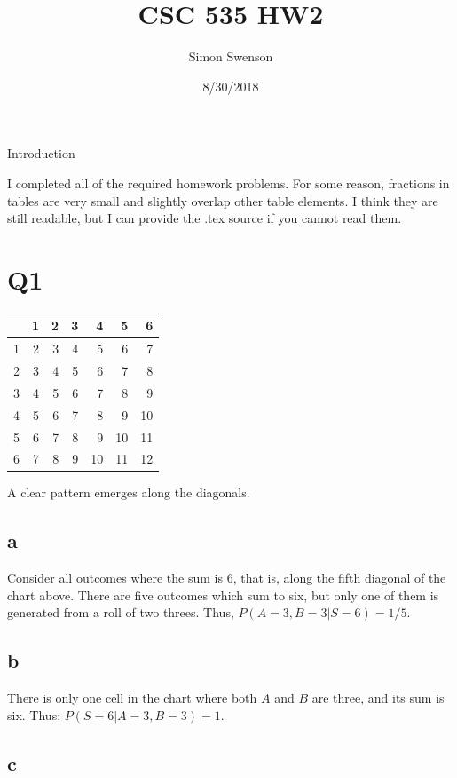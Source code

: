 \documentclass{article}
\title{CSC 535 HW2}
\date{8/30/2018}
\author{Simon Swenson}
\begin{document}
\maketitle
{}

\large Introduction

\small I completed all of the required homework problems. For some reason, 
fractions in tables are very small and slightly overlap other table elements. 
I think they are still readable, but I can provide the .tex source if you 
cannot read them.

\section{Q1}

\begin{tabular}{r | r r r r r r }
	  & 1 & 2 & 3 & 4 & 5 & 6 \\
	\hline
	1 & 2 & 3 & 4 & 5 & 6 & 7 \\
	2 & 3 & 4 & 5 & 6 & 7 & 8 \\
	3 & 4 & 5 & 6 & 7 & 8 & 9 \\
	4 & 5 & 6 & 7 & 8 & 9 & 10 \\
	5 & 6 & 7 & 8 & 9 & 10 & 11 \\
	6 & 7 & 8 & 9 & 10 & 11 & 12 \\
\end{tabular}

A clear pattern emerges along the diagonals.

\subsection{a}

Consider all outcomes where the sum is 6, that is, along the fifth diagonal of 
the chart above. There are five outcomes which sum to six, but only one of them 
is generated from a roll of two threes. Thus, $ P(A=3, B=3 | S=6) = 1/5 $.

\subsection{b}

There is only one cell in the chart where both $ A $ and $ B $ are three, and 
its sum is six. Thus: $ P(S=6 | A=3, B=3) = 1$.

\subsection{c}
\end{document}
